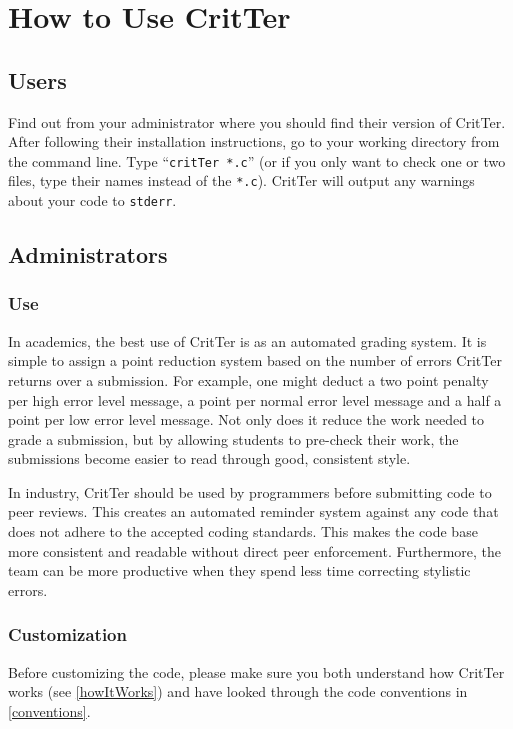 \documentclass[12pt]{report}
\newcommand{\programName}{CritTer\xspace}
\begin{document}
\chapter{How to Use \programName}

\section{Users}
Find out from your administrator where you should find their version of \programName. After following 
their installation instructions, go to your working directory from the command line. Type 
``\lstinline{critTer *.c}'' (or if you only want to check one or two files, type their names instead of the 
\lstinline{*.c}). \programName will output any warnings about your code to \lstinline{stderr}.

\section{Administrators}

\subsection{Use}
In academics, the best use of \programName is as an automated grading system. It is simple to assign a 
point reduction system based on the number of errors \programName returns over a submission. For 
example, one might deduct a two point penalty per high error level message, a point per normal error 
level message and a half a point per low error level message. Not only does it reduce the work needed 
to grade a submission, but by allowing students to pre-check their work, the submissions become easier 
to read through good, consistent style.

In industry, \programName should be used by programmers before submitting code to peer reviews. This 
creates an automated reminder system against any code that does not adhere to the accepted coding 
standards. This makes the code base more consistent and readable without direct peer enforcement. 
Furthermore, the team can be more productive when they spend less time correcting stylistic errors.

\subsection{Customization}
Before customizing the code, please make sure you both understand how \programName works (see 
\autoref{howItWorks}) and have looked through the code conventions in \autoref{conventions}.
\end{document}
